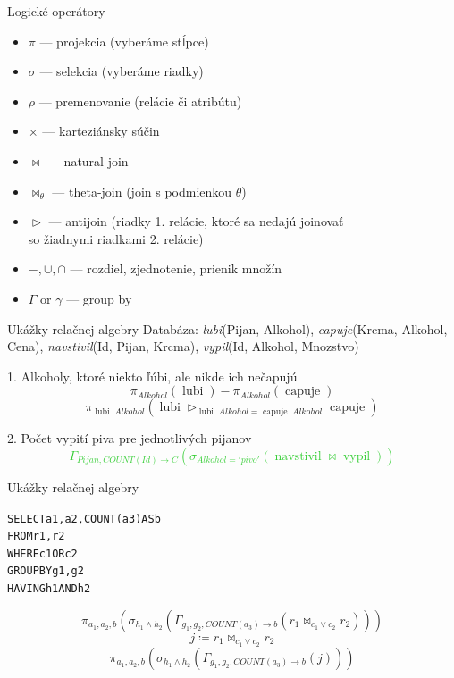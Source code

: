 \documentclass[12pt]{beamer}
\def\blue#1{\textcolor{Cerulean}{#1}}
\def\green#1{\textcolor{LimeGreen}{#1}}
\DeclareMathOperator{\join}{\bowtie}
\DeclareMathOperator{\antijoin}{\rhd}
\DeclareMathOperator{\lubi}{lubi}
\DeclareMathOperator{\capuje}{capuje}
\DeclareMathOperator{\navstivil}{navstivil}
\DeclareMathOperator{\vypil}{vypil}
\begin{document}
\begin{frame}[fragile]{Logické operátory}
\begin{itemize}
    \item $\pi$ --- projekcia (vyberáme stĺpce)
    \item $\sigma$ --- selekcia (vyberáme riadky)
    \item $\rho$ --- premenovanie (relácie či atribútu)
    \item $\times$ --- karteziánsky súčin
    \item $\bowtie$ --- natural join
    \item $\bowtie_\theta$ --- theta-join (join s podmienkou $\theta$)
    \item $\antijoin$ --- antijoin (riadky 1. relácie, ktoré sa nedajú joinovať\\ \hskip 2.5cm so žiadnymi riadkami 2. relácie)
    \item $-, \cup, \cap$ --- rozdiel, zjednotenie, prienik množín
    \item $\Gamma$ or $\gamma$ --- group by
\end{itemize}
\end{frame}

\begin{frame}[fragile]{Ukážky relačnej algebry}
Databáza: \emph{lubi}(Pijan, Alkohol), \emph{capuje}(Krcma, Alkohol, Cena),
\emph{navstivil}(Id, Pijan, Krcma), \emph{vypil}(Id, Alkohol, Mnozstvo)

\bigskip

1. Alkoholy, ktoré niekto ľúbi, ale nikde ich nečapujú
\blue{
$$
    \pi_{Alkohol} (\lubi) - \pi_{Alkohol}(\capuje)
$$
$$
    \pi_{\lubi.Alkohol} (\lubi\antijoin_{\lubi.Alkohol = \capuje.Alkohol} \capuje)
$$
}

2. Počet vypití piva pre jednotlivých pijanov
\green{
$$
    \Gamma_{Pijan, COUNT(Id)\rightarrow C}(\sigma_{Alkohol='pivo'}(\navstivil\join\vypil))
$$
}
\end{frame}

\begin{frame}[fragile]{Ukážky relačnej algebry}
\begin{alltt}
SELECT a1, a2, COUNT(a3) AS b
FROM r1, r2
WHERE c1 OR c2
GROUP BY g1, g2
HAVING h1 AND h2
\end{alltt}
$$
    \pi_{a_1, a_2, b}(\sigma_{h_1\land h_2}(\Gamma_{g_1, g_2, COUNT(a_3)\rightarrow b} (r_1\bowtie_{c_1 \lor c_2} r_2)))
$$
\bigskip
$$j \coloneqq r_1\bowtie_{c_1 \lor c_2} r_2$$
$$\pi_{a_1, a_2, b}(\sigma_{h_1\land h_2}(\Gamma_{g_1, g_2, COUNT(a_3)\rightarrow b} (j)))$$
\end{frame}
\end{document}
